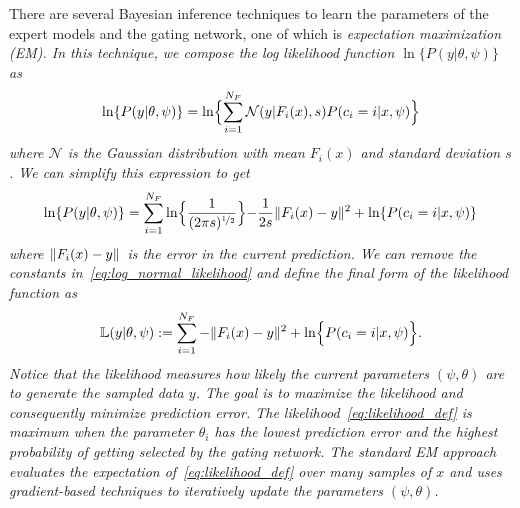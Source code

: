 There are several Bayesian inference techniques to learn the parameters of the
expert models and the gating network, one of which is \it{expectation
maximization} \normalfont (EM).
%
In this technique, we compose the log likelihood function $\ln \{P(y | \theta,
\psi) \}$ as~\cite{bishop2006pattern}   
\begin{equation}
  \ln \{P(y | \theta, \psi) \} = \ln \Bigl\{ \sum_{i=1}^{N_F} \mathcal{N}(y | F_i(x), s) P(c_i = i | x, \psi) \Bigr\}
  \label{eq:likelihood}
\end{equation}
\noindent where $\mathcal{N}$ is the Gaussian distribution with mean $F_i(x)$
and standard deviation $s$. We can simplify this expression to get 
\begin{align}
  \ln \{P(y | \theta, \psi) \} = \sum_{i=1}^{N_F} \ln \Bigr\{ \frac{1}{(2 \pi s)^{\nicefrac{1}{2}}} \Bigl\} - \frac{1}{2s}\|{F_i(x) - y}\|_{{}_{}}^2 + \ln \{P(c_i=i | x, \psi) \}
  \label{eq:log_normal_likelihood}
\end{align}
\noindent where $\|{F_i(x) - y}\|_{{}_{}}$ is the error in the current prediction.
%
We can remove the constants in~\eqref{eq:log_normal_likelihood} and define the
final form of the likelihood function as
\begin{align}
  \mathbb{L}(y | \theta, \psi) := \sum_{i=1}^{N_F} - \|{F_i(x) - y}\|_{{}_{}}^2 + \ln \Bigl\{ P(c_i=i | x, \psi) \Bigr\}.
  \label{eq:likelihood_def}
\end{align}
Notice that the likelihood measures how likely the current parameters $(\psi,
\theta)$ are to generate the sampled data $y$. 
%
The goal is to maximize the likelihood and consequently minimize prediction
error.
%
The likelihood~\eqref{eq:likelihood_def} is maximum when the parameter $\theta_i$
has the lowest prediction error and the highest probability of getting selected
by the gating network.
%
The standard EM approach evaluates the expectation of~\eqref{eq:likelihood_def}
over many samples of $x$ and uses gradient-based techniques to iteratively
update the parameters $(\psi, \theta)$.
%